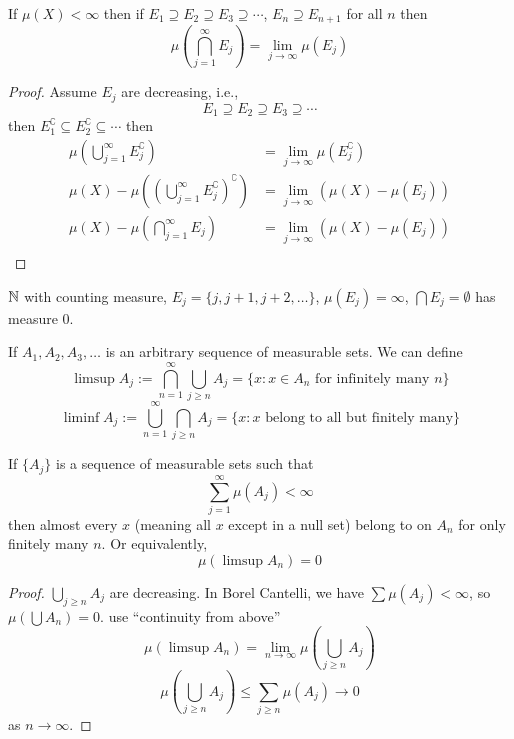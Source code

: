 \begin{theorem}\label{lem:continuity-from-above}
  If $\mu(X) < \infty$ then if $E_1 \supseteq E_2 \supseteq E_3 \supseteq \dotsm$, $E_n \supseteq E_{n+1}$ for all $n$ then
  \[\mu\left(\bigcap_{j=1}^\infty E_j\right) = \lim_{j \to \infty} \mu(E_j)\] 
\end{theorem}

\begin{proof}
  Assume $E_j$ are decreasing, i.e.,
  \[E_1 \supseteq E_2 \supseteq E_3 \supseteq \dotsm \]
  then $E_1^\complement \subseteq E_2^\complement \subseteq \dotsm$ then
  \begin{align*}
  \mu\left(\bigcup_{j=1}^\infty E_j^\complement\right) &= \lim_{j \to \infty} \mu(E_j^\complement) \\
  \mu(X) - \mu\left(\left(\bigcup_{j=1}^\infty E_j^\complement\right)^\complement\right) &= \lim_{j \to \infty}( \mu(X) - \mu(E_j) )\\
  \mu(X) - \mu\left(\bigcap_{j=1}^\infty E_j\right) &= \lim_{j \to \infty} (\mu(X) - \mu(E_j)) \\
  \end{align*}
\end{proof}

\begin{example}
  $\mathbb N$ with counting measure, $E_{j} = \{j, j+1, j+2, \dotsc\}$, $\mu(E_j) = \infty$,
  $\bigcap{E_j} = \emptyset$ has measure 0.
\end{example}

\begin{definition}
  If $A_1, A_2, A_3, \dotsc$ is an arbitrary sequence of measurable sets. 
  We can define 
  \[\limsup A_j := \bigcap_{n=1}^\infty \bigcup_{j \ge n} A_j = \{x : x \in A_n \text{ for infinitely many }n\}\]
  \[\liminf A_j := \bigcup_{n=1}^\infty \bigcap_{j \ge n} A_j = \{x : x \text{ belong to all but finitely many}\}\]
\end{definition}

\begin{lemma}
  If $\{A_j\}$ is a sequence of measurable sets such that 
  \[\sum_{j=1}^\infty \mu(A_j) < \infty\]
  then almost every $x$ (meaning all $x$ except in a null set) belong to on $A_n$ for only finitely many $n$.
  Or equivalently, 
  \[\mu\left(\limsup A_n\right) = 0\]
\end{lemma}

\begin{proof}
  $\bigcup_{j \ge n} A_j$ are decreasing. In Borel Cantelli, we have $\sum \mu(A_j) < \infty$, so $\mu\left(\bigcup A_n\right) = 0$. 
  use ``continuity from above'' $$\mu(\limsup A_n) = \lim_{n \to \infty} \mu\left(\bigcup_{j \ge n} A_j\right)$$
  \[\mu\left(\bigcup_{j \ge n} A_j\right) \le \sum_{j \ge n} \mu(A_j) \to 0\]
  as $n \to \infty$.
\end{proof}

